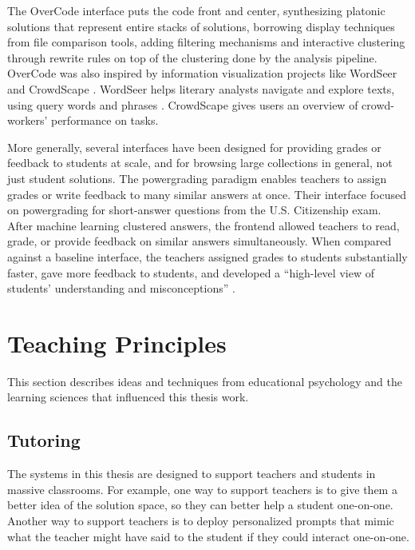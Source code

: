 The OverCode interface puts the code front and center, synthesizing platonic solutions that represent entire stacks of solutions, borrowing display techniques from file comparison tools, adding filtering mechanisms and interactive clustering through rewrite rules on top of the clustering done by the analysis pipeline. OverCode was also inspired by information visualization projects like WordSeer \cite{wordseerlitcomp13,wordseercikm13} and CrowdScape \cite{crowdscape}. WordSeer helps literary analysts navigate and explore texts, using query words and phrases \cite{wordseerhcir11}. CrowdScape gives users an overview of crowd-workers' performance on tasks.

More generally, several interfaces have been designed for providing grades or feedback to students at scale, and for browsing large collections in general, not just student solutions. The powergrading paradigm \cite{basupowergrading} enables teachers to assign grades or write feedback to many similar answers at once. Their interface focused on powergrading for short-answer questions from the U.S. Citizenship exam. After machine learning clustered answers, the frontend allowed teachers to read, grade, or provide feedback on similar answers simultaneously. When compared against a baseline interface, the teachers assigned grades to students substantially faster, gave more feedback to students, and developed a ``high-level view of students' understanding and misconceptions'' \cite{basuDivideAndConquer}.

\section{Teaching Principles}


This section describes ideas and techniques from educational psychology and the learning sciences that influenced this thesis work. 

\subsection{Tutoring}

The systems in this thesis are designed to support teachers and students in massive classrooms. For example, one way to support teachers is to give them a better idea of the solution space, so they can better help a student one-on-one. Another way to support teachers is to deploy personalized prompts that mimic what the teacher might have said to the student if they could interact one-on-one.

